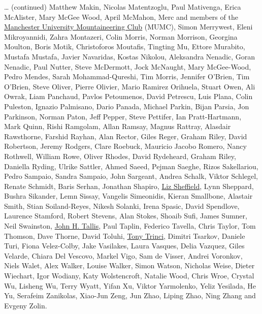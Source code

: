 \documentclass[
]{book}
\begin{document}
\ldots{} (continued) Matthew Makin, Nicolas Matentzoglu, Paul Mativenga, Erica McAlister, Mary McGee Wood, April McMahon, Merc and members of the \href{https://www.mumc.me.uk/wordpress}{Manchester University Mountaineering Club} (MUMC), Simon Merrywest, Eleni Mikroyannidi, Zahra Montazeri, Colin Morris, Norman Morrison, Georgina Moulton, Boris Motik, Christoforos Moutafis, Tingting Mu, Ettore Murabito, Mustafa Mustafa, Javier Navaridas, Kostas Nikolou, Aleksandra Nenadic, Goran Nenadic, Paul Nutter, Steve McDermott, Jock McNaught, Mary McGee-Wood, Pedro Mendes, Sarah Mohammad-Qureshi, Tim Morris, Jennifer O'Brien, Tim O'Brien, Steve Oliver, Pierre Olivier, Mario Ramirez Orihuela, Stuart Owen, Ali Owrak, Liam Panchaud, Pavlos Petoumenos, David Petrescu, Luis Plana, Colin Puleston, Ignazio Palmisano, Dario Panada, Michael Parkin, Bijan Parsia, Jon Parkinson, Norman Paton, Jeff Pepper, Steve Pettifer, Ian Pratt-Hartmann, Mark Quinn, Rishi Ramgolam, Allan Ramsay, Magnus Rattray, Alasdair Rawsthorne, Farshid Rayhan, Alan Rector, Giles Reger, Graham Riley, David Robertson, Jeremy Rodgers, Clare Roebuck, Mauricio Jacobo Romero, Nancy Rothwell, William Rowe, Oliver Rhodes, David Rydeheard, Graham Riley, Daniella Ryding, Ulrike Sattler, Ahmed Saeed, Pejman Saeghe, Rizos Sakellariou, Pedro Sampaio, Sandra Sampaio, John Sargeant, Andrea Schalk, Viktor Schlegel, Renate Schmidt, Baris Serhan, Jonathan Shapiro, \href{https://www.manchester.ac.uk/discover/governance/structure/board-governors/members/liz-sheffield/}{Liz Sheffield}, Lynn Sheppard, Bushra Sikander, Lemn Sissay, Vangelis Simeonidis, Kieran Smallbone, Alastair Smith, Stian Soiland-Reyes, Nikesh Solanki, Irena Spasic, David Spendlove, Laurence Stamford, Robert Stevens, Alan Stokes, Shoaib Sufi, James Sumner, Neil Swainston, \href{https://doi.org/10.1002/jqs.3390060408}{John H. Tallis}, Paul Taplin, Federico Tavella, Chris Taylor, Tom Thomson, Dave Thorne, David Toluhi, \href{https://www.theguardian.com/science/2020/nov/10/tony-trinci-obituary}{Tony Trinci}, Dimitri Tsarkov, Daniele Turi, Fiona Velez-Colby, Jake Vasilakes, Laura Vasques, Delia Vazquez, Giles Velarde, Chiara Del Vescovo, Markel Vigo, Sam de Visser, Andrei Voronkov, Niels Walet, Alex Walker, Louise Walker, Simon Watson, Nicholas Weise, Dieter Wiechart, Igor Wodiany, Katy Wolstencroft, Natalie Wood, Chris Wroe, Crystal Wu, Lisheng Wu, Terry Wyatt, Yifan Xu, Viktor Yarmolenko, Yeliz Yesilada, He Yu, Serafeim Zanikolas, Xiao-Jun Zeng, Jun Zhao, Liping Zhao, Ning Zhang and Evgeny Zolin.
\end{document}
